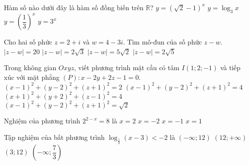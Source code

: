 \begin{ex}%
	Hàm số nào dưới đây là hàm số đồng biến trên $\mathbb{R}$?
	\choice
	{$y=\left( \sqrt{2}-1 \right)^x$}
	{$y=\log_3 x$}
	{$y=\left( \dfrac{1}{3} \right)^x$}
	{\True $y=3^x$}
\end{ex}
\begin{ex}%
	Cho hai số phức $z=2+i$ và $w=4-3i$. Tìm mô-đun của số phức $z-w$.
	\choice
	{$\left| z-w \right|=20$}
	{$\left| z-w \right|=2\sqrt{3}$}
	{$\left| z-w \right|=5\sqrt{2}$}
	{\True $\left| z-w \right|=2\sqrt{5}$}
\end{ex}
\begin{ex}%
	Trong không gian $Oxyz$, viết phương trình mặt cầu có tâm $ I\left(1;2;-1\right)$ và tiếp xúc với
	mặt phẳng $(P)\colon x-2y+2z-1=0$.
	\choice
	{$\left(x-1\right)^2+\left(y-2\right)^2+\left(z+1\right)^2=2$}
	{\True $\left(x-1\right)^2+\left(y-2\right)^2+\left(z+1\right)^2=4$}
	{$\left(x+1\right)^2+\left(y+2\right)^2+\left(z-1\right)^2=4$}
	{$\left(x-1\right)^2+\left(y-2\right)^2+\left(z+1\right)^2=\sqrt{2}$}
\end{ex}
\begin{ex}%
	Nghiệm của phương trình $2^{2-x}=8$ là 
	\choice
	{$ x=2$}
	{$ x=-2$}
	{\True $ x=-1$}
	{$ x=1$}
\end{ex}
\begin{ex}%
	Tập nghiệm của bất phương trình $\log_{\tfrac{1}{3}}\left(x-3\right)<-2$ là
	\choice
	{$\left(-\infty;12\right)$}
	{\True $\left(12;+\infty\right)$}
	{$\left(3;12\right)$}
	{$\left(-\infty;\dfrac{7}{3}\right)$}
\end{ex}

